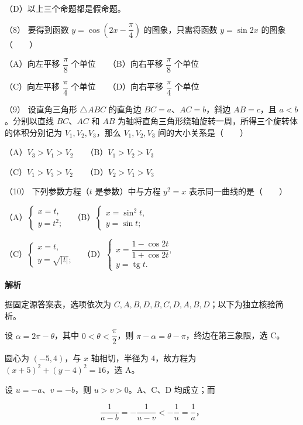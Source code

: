 \begin{answer}
（D）以上三个命题都是假命题。

（8） 要得到函数 $y=\cos\left(2x-\dfrac\pi4\right)$ 的图象，只需将函数 $y=\sin 2x$ 的图象\mbox{（　　）}

（A）向左平移 $\dfrac\pi8$ 个单位　　（B）向右平移 $\dfrac\pi8$ 个单位

（C）向左平移 $\dfrac\pi4$ 个单位　　（D）向右平移 $\dfrac\pi4$ 个单位

（9） 设直角三角形 $\triangle ABC$ 的直角边 $BC=a$、$AC=b$，斜边 $AB=c$，且 $a<b$。分别以直线 $BC$、$AC$ 和 $AB$ 为轴将直角三角形绕轴旋转一周，所得三个旋转体的体积分别记为 $V_1,V_2,V_3$，那么 $V_1,V_2,V_3$ 间的大小关系是\mbox{（　　）}

（A）$V_3>V_1>V_2$　　（B）$V_1>V_2>V_3$

（C）$V_1>V_3>V_2$　　（D）$V_2>V_1>V_3$

（10） 下列参数方程（$t$ 是参数）中与方程 $y^2=x$ 表示同一曲线的是\mbox{（　　）}

（A）$\begin{cases}x=t,\\y=t^2;\end{cases}$
　（B）$\begin{cases}x=\sin^2t,\\y=\sin t;\end{cases}$

（C）$\begin{cases}x=t,\\y=\sqrt{|t|};\end{cases}$
　（D）$\begin{cases}x=\dfrac{1-\cos2t}{1+\cos2t},\\y=\operatorname{tg}t.\end{cases}$

\textbf{解析}

据固定源答案表，选项依次为 $C,A,B,D,B,C,D,A,B,D$；以下为独立核验简析。


设 $\alpha=2\pi-\theta$，其中 $0<\theta<\dfrac\pi2$，则 $\pi-\alpha=\theta-\pi$，终边在第三象限，选 C。


圆心为 $(-5,4)$，与 $x$ 轴相切，半径为 $4$，故方程为 $(x+5)^2+(y-4)^2=16$，选 A。


设 $u=-a$、$v=-b$，则 $u>v>0$。A、C、D 均成立；而

\nopagebreak[4]
\[
\frac1{a-b}=-\frac1{u-v}<-\frac1u=\frac1a\text{，}
\]


\end{answer}
